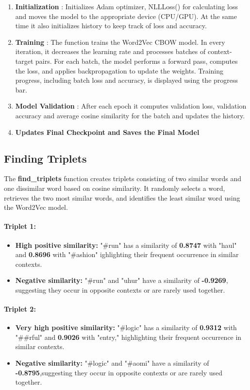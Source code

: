 \documentclass{article}
\begin{document}
\begin{enumerate}

\item \textbf{Initialization} : Initializes Adam optimizer, NLLLoss() for calculating loss and moves the model to the appropriate device (CPU/GPU). At the same time it also initializes history to keep track of loss and accuracy.

\item \textbf{Training} : The function trains the Word2Vec CBOW model. In every iteration, it decreases the learning rate and processes batches of context-target pairs. For each batch, the model performs a forward pass, computes the loss, and applies backpropagation to update the weights. Training progress, including batch loss and accuracy, is displayed using the progress bar.
\item \textbf{Model Validation} : After each epoch it computes validation loss, validation accuracy and average cosine similarity for the batch and updates the history.

\item \textbf{Updates Final Checkpoint and Saves the Final Model}
\end{enumerate}

\subsection{Finding Triplets}
The \textbf{find\_triplets} function creates triplets consisting of two similar words and one dissimilar word based on cosine similarity. It randomly selects a word, retrieves the two most similar words, and identifies the least similar word using the Word2Vec model.

\paragraph{Triplet 1:}
\begin{itemize}
    \item \textbf{High positive similarity:} "\#run" has a similarity of \textbf{0.8747} with "haul" and \textbf{0.8696} with "\#ashion"  ighlighting their frequent occurrence in similar contexts.
    \item \textbf{Negative similarity:} "\#run" and "uhur" have a similarity of \textbf{-0.9269}, suggesting they occur in opposite contexts or are rarely used together.
\end{itemize}

\paragraph{Triplet 2:}
\begin{itemize}
    \item \textbf{Very high positive similarity:} "\#logic" has a similarity of \textbf{0.9312} with "\#\#rful" and \textbf{0.9026} with "entry," highlighting their frequent occurrence in similar contexts.
    \item \textbf{Negative similarity:} "\#logic" and "\#aomi" have a similarity of \textbf{-0.8795},suggesting they occur
in opposite contexts or are rarely used together.
\end{itemize}
\end{document}
